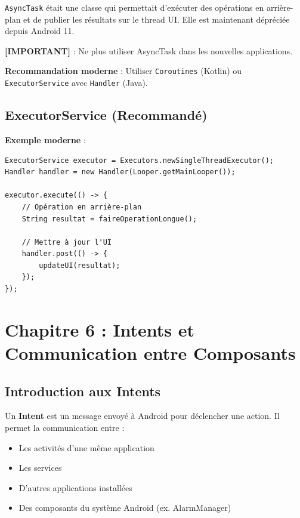 \documentclass[11pt,a4paper]{article}
\begin{document}
\texttt{AsyncTask} était une classe qui permettait d'exécuter des opérations en arrière-plan et de publier les résultats sur le thread UI. Elle est maintenant dépréciée depuis Android 11.

\textbf{[IMPORTANT]} : Ne plus utiliser AsyncTask dans les nouvelles applications.

\textbf{Recommandation moderne} : Utiliser \texttt{Coroutines} (Kotlin) ou \texttt{ExecutorService} avec \texttt{Handler} (Java).

\subsection{ExecutorService (Recommandé)}

\textbf{Exemple moderne} :
\begin{lstlisting}
ExecutorService executor = Executors.newSingleThreadExecutor();
Handler handler = new Handler(Looper.getMainLooper());

executor.execute(() -> {
    // Opération en arrière-plan
    String resultat = faireOperationLongue();
    
    // Mettre à jour l'UI
    handler.post(() -> {
        updateUI(resultat);
    });
});
\end{lstlisting}


\section{Chapitre 6 : Intents et Communication entre Composants}

\subsection{Introduction aux Intents}

Un \textbf{Intent} est un message envoyé à Android pour déclencher une action. Il permet la communication entre :
\begin{itemize}
    \item Les activités d'une même application
    \item Les services
    \item D'autres applications installées
    \item Des composants du système Android (ex. AlarmManager)
\end{itemize}
\end{document}

